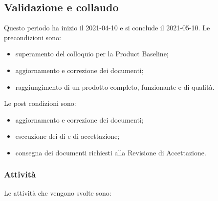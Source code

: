 \subsection{Validazione e collaudo}
Questo periodo ha inizio il 2021-04-10 e si conclude il 2021-05-10.
Le precondizioni sono:
\begin{itemize}
	\item superamento del colloquio per la Product Baseline;
	\item aggiornamento e correzione dei documenti;
	\item raggiungimento di un prodotto completo, funzionante e di qualità.
\end{itemize}
Le post condizioni sono:
\begin{itemize}
	\item aggiornamento e correzione dei documenti;
	\item esecuzione dei  di  e di accettazione;
	\item consegna dei documenti richiesti alla Revisione di Accettazione.
\end{itemize}
\subsubsection{Attività}
Le attività che vengono svolte sono:

